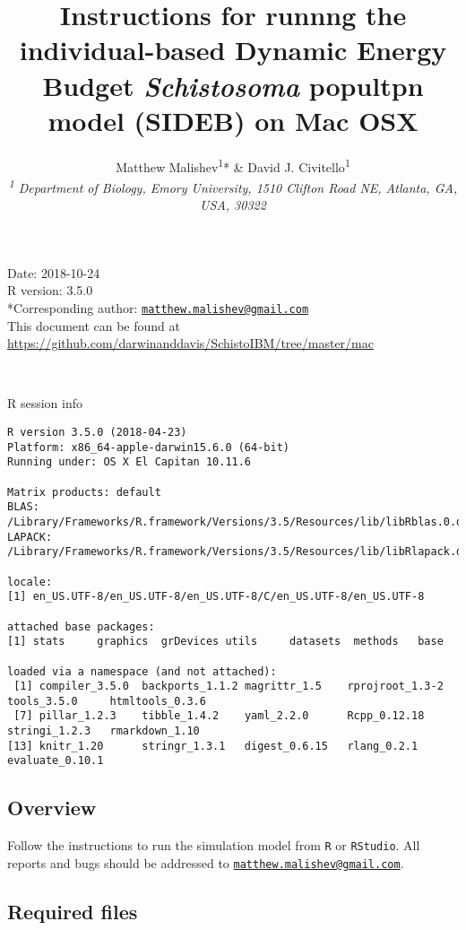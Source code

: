 \documentclass[10,portrait]{article}
\title{Instructions for runnng the individual-based Dynamic Energy Budget
\emph{Schistosoma} popultpn model (SIDEB) on Mac OSX}
\author{Matthew Malishev\textsuperscript{1}* \& David J.
Civitello\textsuperscript{1}\\[2\baselineskip]\emph{\textsuperscript{1}
Department of Biology, Emory University, 1510 Clifton Road NE, Atlanta,
GA, USA, 30322}}
\date{}
\begin{document}
\maketitle

{
\hypersetup{linkcolor=black}
\setcounter{tocdepth}{4}
\tableofcontents
}
\newpage   

Date: 2018-10-24\\
R version: 3.5.0\\
*Corresponding author:
\href{mailto:matthew.malishev@gmail.com}{\nolinkurl{matthew.malishev@gmail.com}}\\
This document can be found at
\url{https://github.com/darwinanddavis/SchistoIBM/tree/master/mac}

~

R session info

\begin{verbatim}
R version 3.5.0 (2018-04-23)
Platform: x86_64-apple-darwin15.6.0 (64-bit)
Running under: OS X El Capitan 10.11.6

Matrix products: default
BLAS: /Library/Frameworks/R.framework/Versions/3.5/Resources/lib/libRblas.0.dylib
LAPACK: /Library/Frameworks/R.framework/Versions/3.5/Resources/lib/libRlapack.dylib

locale:
[1] en_US.UTF-8/en_US.UTF-8/en_US.UTF-8/C/en_US.UTF-8/en_US.UTF-8

attached base packages:
[1] stats     graphics  grDevices utils     datasets  methods   base     

loaded via a namespace (and not attached):
 [1] compiler_3.5.0  backports_1.1.2 magrittr_1.5    rprojroot_1.3-2 tools_3.5.0     htmltools_0.3.6
 [7] pillar_1.2.3    tibble_1.4.2    yaml_2.2.0      Rcpp_0.12.18    stringi_1.2.3   rmarkdown_1.10 
[13] knitr_1.20      stringr_1.3.1   digest_0.6.15   rlang_0.2.1     evaluate_0.10.1
\end{verbatim}

\newpage  

\subsection{Overview}\label{overview}

Follow the instructions to run the simulation model from \texttt{R} or
\texttt{RStudio}. All reports and bugs should be addressed to
\href{mailto:matthew.malishev@gmail.com}{\nolinkurl{matthew.malishev@gmail.com}}.

\subsection{Required files}\label{required-files}
\end{document}
